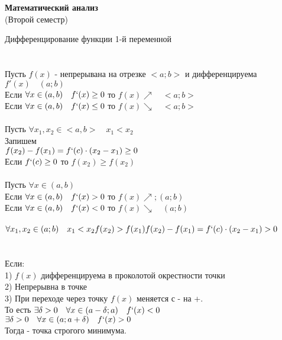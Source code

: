 \begin{center}
  {\bfseries{\huge Математический анализ}} \\
  \LARGE{(Второй семестр)} \\

\end{center}

  \large{Дифференцирование функции 1-й переменной} \\

 \\

 \\
Пусть $f(x)$ - непрерывана на отрезке $<a; b>$ и дифференцируема \\
$f'(x) \quad (a;b)$ \\
Если $\forall x \in (a,b) \quad f`(x) \ge 0 $ то $f(x) \nearrow \quad <a; b>$ \\
Если $\forall x \in (a,b) \quad f`(x) \le 0 $ то $f(x) \searrow \quad <a; b>$ \\

 \\
Пусть $\forall x_{1}, x_{2} \in <a,b> \quad x_{1} < x_{2} $ \\
Запишем  \\
$f(x_{2}) - f(x_{1}) = f`(c) \cdot (x_{2} - x_{1}) \ge 0 $ \\
Если $f`(c) \ge 0$ то $f(x_{2}) \ge f(x_{2})$ \\

 \\
Пусть $\forall x \in (a, b)$ \\
Если $\forall x \in (a, b) \quad f`(x) > 0$ то $f(x) \nearrow; (a; b)$ \\
Если $\forall x \in (a, b) \quad f`(x) < 0$ то $f(x) \searrow \quad (a; b)$ \\

 \\
$\forall x_{1}, x_{2} \in (a; b) \quad x_{1} < x_{2} \\
f(x_{2}) > f(x_{1}) \\
f(x_{2}) - f(x_{1}) = f`(c) \cdot (x_{2} - x_{1}) > 0$ \\

 \\

 \\
Если: \\
  1) $f(x)$ дифференцируема в проколотой окрестности точки \\
  2) Непрерывна в точке  \\
  3) При переходе через точку  $f(x)$ меняется с - на +. \\
  То есть $\exists \delta > 0 \quad \forall x \in (a - \delta; a) \quad f`(x) < 0$ \\
       $\exists \delta > 0 \quad \forall x \in (a; a + \delta) \quad f`(x) > 0$ \\
Тогда  - точка строгого минимума. \\

